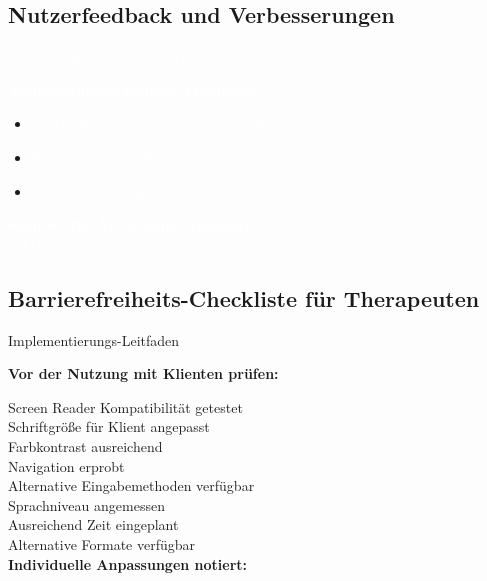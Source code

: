 \subsection{Nutzerfeedback und Verbesserungen}

\begin{ctmmRedBox}{\textcolor{white}{Accessibility Feedback-System}}

\textcolor{white}{\textbf{Verbesserungsvorschläge erwünscht:}}

\begin{itemize}
  \item[\textcolor{white}{*}] \textcolor{white}{Welche Barrieren sind Ihnen aufgefallen?}
  \item[\textcolor{white}{*}] \textcolor{white}{Welche assistiven Technologien nutzen Sie?}
  \item[\textcolor{white}{*}] \textcolor{white}{Welche Anpassungen wären hilfreich?}
\end{itemize}

\textcolor{white}{\textbf{Kontakt für Accessibility-Feedback:}}\\
\textcolor{white}{E-Mail: accessibility@ctmm-system.org}

\end{ctmmRedBox}

\subsection{Barrierefreiheits-Checkliste für Therapeuten}

\begin{ctmmGreenBox}{Implementierungs-Leitfaden}

\textbf{Vor der Nutzung mit Klienten prüfen:}

\CheckBox[name=accessibility_screen_reader,width=1em,height=1em]{} Screen Reader Kompatibilität getestet \\
\CheckBox[name=accessibility_font_size,width=1em,height=1em]{} Schriftgröße für Klient angepasst \\
\CheckBox[name=accessibility_color_contrast,width=1em,height=1em]{} Farbkontrast ausreichend \\
\CheckBox[name=accessibility_navigation,width=1em,height=1em]{} Navigation erprobt \\
\CheckBox[name=accessibility_input_methods,width=1em,height=1em]{} Alternative Eingabemethoden verfügbar \\
\CheckBox[name=accessibility_language_level,width=1em,height=1em]{} Sprachniveau angemessen \\
\CheckBox[name=accessibility_time_limits,width=1em,height=1em]{} Ausreichend Zeit eingeplant \\
\CheckBox[name=accessibility_backup_formats,width=1em,height=1em]{} Alternative Formate verfügbar \\

\textbf{Individuelle Anpassungen notiert:} \\
\TextField[name=accessibility_individual_notes,width=14cm,height=3em,multiline=true,bordercolor=ctmmGreen,backgroundcolor=ctmmGreen!5]{}

\end{ctmmGreenBox}

\newpage

